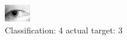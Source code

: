 \begin{figure}[h!]
\begin{center}
\includegraphics[width=0.60\columnwidth]{figures/ID1312_class_4_target_3.png}
\end{center}
\caption{ Classification: 4 actual target: 3}
\label{fig:ID1312_class_4_target_3}
\end{figure}
